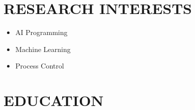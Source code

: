 \documentclass[10pt,a4paper,sans]{moderncv} %
\begin{document}
	
	\makecvtitle
	
	\section{RESEARCH INTERESTS}

		
		   \begin{itemize}
		    \item AI Programming
		     \item Machine Learning
		     
		   \end{itemize}
		
		      \begin{itemize}
		       \item Process Control
		       
		      \end{itemize}
		     

	
	\vspace{-0.9em}
	
	\section{EDUCATION}
	
\end{document}
